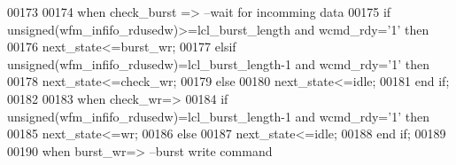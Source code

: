 \begin{DoxyCode}
00173 
00174         \textcolor{keywordflow}{when} \textcolor{vhdlchar}{check\_burst} \textcolor{vhdlchar}{=}\textcolor{vhdlchar}{>}\textcolor{keyword}{     --wait for incomming data}
00175             \textcolor{keywordflow}{if} \textcolor{comment}{unsigned}\textcolor{vhdlchar}{(}\textcolor{vhdlchar}{wfm_infifo_rdusedw}\textcolor{vhdlchar}{)}\textcolor{vhdlchar}{>=}\textcolor{vhdlchar}{lcl_burst_length} \textcolor{keywordflow}{and} \textcolor{vhdlchar}{wcmd_rdy}\textcolor{vhdlchar}{=}\textcolor{vhdlchar}{'}\textcolor{vhdllogic}{}\textcolor{vhdllogic}{1}\textcolor{vhdlchar}{'} \textcolor{keywordflow}{then} 
00176                 \textcolor{vhdlchar}{next_state}\textcolor{vhdlchar}{<=}\textcolor{vhdlchar}{burst\_wr};
00177             \textcolor{keywordflow}{elsif} \textcolor{comment}{unsigned}\textcolor{vhdlchar}{(}\textcolor{vhdlchar}{wfm_infifo_rdusedw}\textcolor{vhdlchar}{)}\textcolor{vhdlchar}{=}\textcolor{vhdlchar}{lcl_burst_length}\textcolor{vhdlchar}{-}\textcolor{vhdllogic}{}\textcolor{vhdllogic}{1} \textcolor{keywordflow}{and} \textcolor{vhdlchar}{wcmd_rdy}\textcolor{vhdlchar}{=}\textcolor{vhdlchar}{'}\textcolor{vhdllogic}{}\textcolor{vhdllogic}{1}\textcolor{vhdlchar}{'} \textcolor{keywordflow}{then}
00178                 \textcolor{vhdlchar}{next_state}\textcolor{vhdlchar}{<=}\textcolor{vhdlchar}{check\_wr};
00179             \textcolor{keywordflow}{else} 
00180                 \textcolor{vhdlchar}{next_state}\textcolor{vhdlchar}{<=}\textcolor{vhdlchar}{idle};
00181             \textcolor{keywordflow}{end} \textcolor{keywordflow}{if};
00182 
00183         \textcolor{keywordflow}{when} \textcolor{vhdlchar}{check\_wr}\textcolor{vhdlchar}{=}\textcolor{vhdlchar}{>} 
00184             \textcolor{keywordflow}{if} \textcolor{comment}{unsigned}\textcolor{vhdlchar}{(}\textcolor{vhdlchar}{wfm_infifo_rdusedw}\textcolor{vhdlchar}{)}\textcolor{vhdlchar}{=}\textcolor{vhdlchar}{lcl_burst_length}\textcolor{vhdlchar}{-}\textcolor{vhdllogic}{}\textcolor{vhdllogic}{1} \textcolor{keywordflow}{and} \textcolor{vhdlchar}{wcmd_rdy}\textcolor{vhdlchar}{=}\textcolor{vhdlchar}{'}\textcolor{vhdllogic}{}\textcolor{vhdllogic}{1}\textcolor{vhdlchar}{'} \textcolor{keywordflow}{then}
00185                 \textcolor{vhdlchar}{next_state}\textcolor{vhdlchar}{<=}\textcolor{vhdlchar}{wr};
00186             \textcolor{keywordflow}{else} 
00187                 \textcolor{vhdlchar}{next_state}\textcolor{vhdlchar}{<=}\textcolor{vhdlchar}{idle};
00188             \textcolor{keywordflow}{end} \textcolor{keywordflow}{if};
00189 
00190         \textcolor{keywordflow}{when} \textcolor{vhdlchar}{burst\_wr}\textcolor{vhdlchar}{=}\textcolor{vhdlchar}{>}\textcolor{keyword}{     --burst write command}

\end{DoxyCode}
